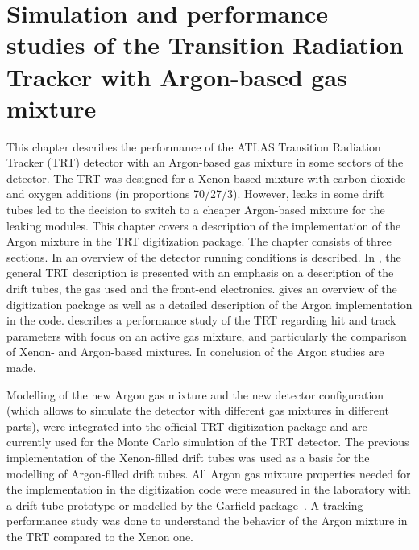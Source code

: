 \chapter{Simulation and performance studies of the Transition Radiation Tracker with Argon-based gas mixture}
\label{chap:TRT}


This chapter describes the performance of the ATLAS Transition Radiation Tracker (TRT) detector with an Argon-based gas mixture in some sectors of the detector.
The TRT was designed for a Xenon-based mixture with carbon dioxide and oxygen additions (in proportions 70/27/3).
However, leaks in some drift tubes led to the decision to switch to a cheaper Argon-based mixture for the leaking modules.
This chapter covers a description of the implementation of the Argon mixture in the TRT digitization package.
The chapter consists of three sections. In  an overview of the detector running conditions is described. In , the general TRT description is presented with an emphasis on a description of the drift tubes, the gas used and the front-end electronics.
 gives an overview of the digitization package as well as a detailed description of the Argon implementation in the code.
 describes a performance study of the TRT regarding hit and track parameters with focus on an active gas mixture, and particularly the comparison of 
Xenon- and Argon-based mixtures.
In  conclusion of the Argon studies are made.

Modelling of the new Argon gas mixture and the new detector configuration (which allows to simulate the detector with different gas mixtures in different parts), 
were integrated into the official TRT digitization package and are currently used for the Monte Carlo simulation of the TRT detector. 
The previous implementation of the Xenon-filled drift tubes was used as a basis for the modelling of Argon-filled drift tubes.
All Argon gas mixture properties needed for the implementation in the digitization code were measured in the laboratory with a drift tube prototype 
or modelled by the Garfield package~\cite{garfield_program}.
A tracking performance study was done to understand the behavior of the Argon mixture in the TRT compared to the Xenon one.

